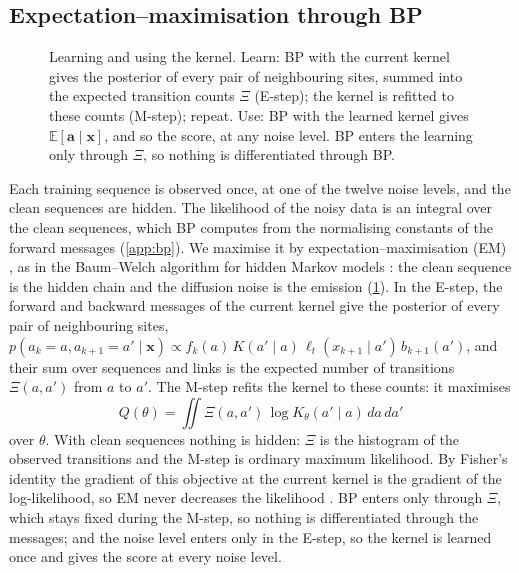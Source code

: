 \documentclass{article}
\begin{document}
\subsection{Expectation--maximisation through BP}
\label{sec:em}

\begin{figure}[t]
  \centering
  
  \caption{Learning and using the kernel. Learn: BP with the current kernel gives the posterior of every pair of
  neighbouring sites, summed into the expected transition counts $\Xi$ (E-step); the kernel is refitted to these
  counts (M-step); repeat. Use: BP with the learned kernel gives $\mathbb E[\mathbf a\mid\mathbf x]$, and so the score,
  at any noise level. BP enters the learning only through $\Xi$, so nothing is differentiated through BP.}
  \label{fig:em-loop}
\end{figure}

Each training sequence is observed once, at one of the twelve noise levels, and the clean sequences are hidden. The
likelihood of the noisy data is an integral over the clean sequences, which BP computes from the normalising constants
of the forward messages (\cref{app:bp}). We maximise it by expectation--maximisation (EM) \cite{dempster1977maximum}, as
in the Baum--Welch algorithm for hidden Markov models \cite{baum1970,rabiner1989tutorial}: the clean sequence is the
hidden chain and the diffusion noise is the emission (\cref{fig:em-loop}). In the E-step, the forward and backward
messages of the current kernel give the posterior of every pair of neighbouring sites,
$p(a_k=a,a_{k+1}=a'\mid\mathbf x)\propto f_k(a)\,K(a'\mid a)\,\ell_t(x_{k+1}\mid a')\,b_{k+1}(a')$, and their sum over
sequences and links is the expected number of transitions $\Xi(a,a')$ from $a$ to $a'$. The M-step refits the kernel
to these counts: it maximises
\begin{equation}
    Q(\theta)=\iint\Xi(a,a')\,\log K_\theta(a'\mid a)\,da\,da'
    \label{eq:em-objective}
\end{equation}
over $\theta$.
With clean sequences nothing is hidden: $\Xi$ is the histogram of the observed transitions and the M-step is ordinary
maximum likelihood. By Fisher's identity \cite{louis1982,cappe2005} the gradient of this objective at the current
kernel is the gradient of the log-likelihood, so EM never decreases the likelihood \cite{dempster1977maximum,wu1983}.
BP enters only through $\Xi$, which stays fixed during the M-step, so nothing is differentiated through the messages;
and the noise level enters only in the E-step, so the kernel is learned once and gives the score at every noise level.
\end{document}
